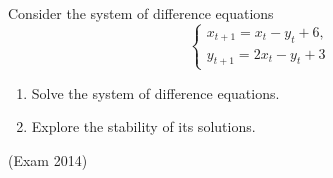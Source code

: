 \begin{solution}
\begin{comment}
Перейдем к решению задачи Коши. Для этого, выписав общее решение $\left(\begin{array}{c} {x_{t} } \\ {y_{t} } \end{array}\right)=C_{1} \left(\begin{array}{c} {1} \\ {1} \end{array}\right)2^{t} +C_{2} \left(\begin{array}{c} {1} \\ {-3} \end{array}\right)(-2)^{t} +\left(\begin{array}{c} {5/3} \\ {0} \end{array}\right)$, положим $t=0$, и приравняем правый столбец решения начальным данным. Из решения системы находим $C_{1} =-\frac{5}{4} , C_{2} =-\frac{5}{12} $.
\end{comment} %

\end{solution}






\begin{problem}
Consider the system of difference equations
\[
\begin{cases}
 x_{t+1} =x_{t} -y_{t} +6, \\ 
 y_{t+1} =2x_{t} -y_{t} +3
\end{cases} 
 \] 

\begin{enumerate}
\item  Solve the system of difference equations.

\item  Explore the stability of its solutions.
\end{enumerate}

(Exam 2014)
\end{problem}

